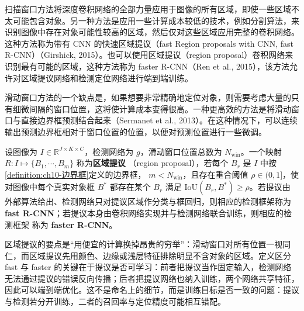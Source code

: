 \documentclass[../../main.tex]{subfiles}
\begin{document}
扫描窗口方法将深度卷积网络的全部力量应用于图像的所有区域，即使一些区域不太可能包含对象。另一种方法是应用一些计算成本较低的技术，例如分割算法，来识别图像中存在对象可能性较高的区域，然后仅对这些区域应用完整的卷积网络。这种方法称为带有 CNN 的快速区域提议（fast Region proposals with CNN, fast R-CNN）（Girshick, 2015）。也可以使用区域提议（region proposal）卷积网络来识别最有可能的区域，这种方法称为 faster R-CNN（Ren et al., 2015），该方法允许对区域提议网络和检测定位网络进行端到端训练。

滑动窗口方法的一个缺点是，如果想要非常精确地定位对象，则需要考虑大量的只有细微间隔的窗口位置，这将使计算成本变得很高。一种更高效的方法是将滑动窗口与直接边界框预测结合起来（Sermanet et al., 2013）。在这种情况下，可以连续输出预测边界框相对于窗口位置的位置，以便对预测位置进行一些微调。

\begin{definition}[区域提议]\label{definition:ch10-区域提议}
设图像为 $I\in\mathbb{R}^{J\times K\times C}$，检测网络为 $g$，滑动窗口位置总数为
$N_{\mathrm{win}}$。一个映射 $R:I\mapsto\{B_1,\cdots,B_m\}$ 称为\textbf{区域提议}
（region proposal），若每个 $B_r$ 是 $I$ 中按\cref{definition:ch10-边界框}定义的边界框，
$m<N_{\mathrm{win}}$，且存在重合阈值 $\rho\in(0,1]$，使对图像中每个真实对象框
$B^{\ast}$ 都存在某个 $B_r$ 满足 $\mathrm{IoU}(B_r,B^{\ast})\geqslant\rho$。若提议由
外部算法给出、检测网络只对提议区域作分类与框回归，则相应的检测框架称为
\textbf{fast R-CNN}；若提议本身由卷积网络实现并与检测网络联合训练，则相应的检测框架
称为 \textbf{faster R-CNN}。
\end{definition}

\begin{remark}
区域提议的要点是“用便宜的计算换掉昂贵的穷举”：滑动窗口对所有位置一视同仁，而区域提议先用颜色、边缘或浅层特征排除明显不含对象的区域。定义区分 fast 与 faster 的关键在于提议是否可学习：前者把提议当作固定输入，检测网络无法通过提议的错误反向传播；后者把提议网络也纳入训练，两个网络共享特征，因此可以端到端优化。这不是命名上的细节，而是训练目标是否一致的问题：提议与检测若分开训练，二者的召回率与定位精度可能相互错配。
\end{remark}
\end{document}

